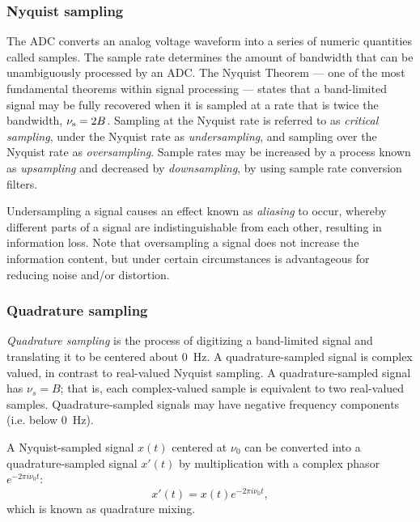 \documentclass{ws-rv961x669}
\begin{document}
\subsubsection{Nyquist sampling \label{sub:sampling}}

The ADC converts an analog voltage waveform into a series of numeric quantities called samples. The sample rate determines the amount of bandwidth that can be unambiguously processed by an ADC. The Nyquist Theorem --- one of the most fundamental theorems within signal processing --- states that a band-limited signal may be fully recovered when it is sampled at a rate that is twice the bandwidth, $\nu_{\rm{s}} = 2 B$. 
Sampling at the  Nyquist rate is referred to as \emph{critical sampling}, under the Nyquist rate as \emph{undersampling}, and sampling over the Nyquist rate as \emph{oversampling}. Sample rates may be increased by a process known as \emph{upsampling} and decreased by \emph{downsampling}, by using sample rate conversion filters.

Undersampling a signal causes an effect known as \emph{aliasing} to occur, whereby different parts of a signal are indistinguishable from each other, resulting in information loss. Note that oversampling a signal does not increase the information content, but under certain circumstances is advantageous for reducing noise and/or distortion.


\subsubsection{Quadrature sampling}

\emph{Quadrature sampling}\cite{Lyons:2000uy} is the process of digitizing a band-limited signal and translating it to be centered about 0~Hz. A quadrature-sampled signal is complex valued, in contrast to real-valued Nyquist sampling. A quadrature-sampled signal has $\nu_{s} = B$; that is, each complex-valued sample is equivalent to two real-valued samples. Quadrature-sampled signals may have negative frequency components (i.e. below 0~Hz).

A Nyquist-sampled signal $x(t)$ centered at $\nu_0$ can be converted into a quadrature-sampled signal $x'(t)$ by multiplication with a complex phasor $e^{-2\pi i \nu_0 t}$:
\begin{equation}
	x'(t) = x(t) e^{-2 \pi i \nu_0 t},
\end{equation}
which is known as quadrature mixing.
\end{document}
